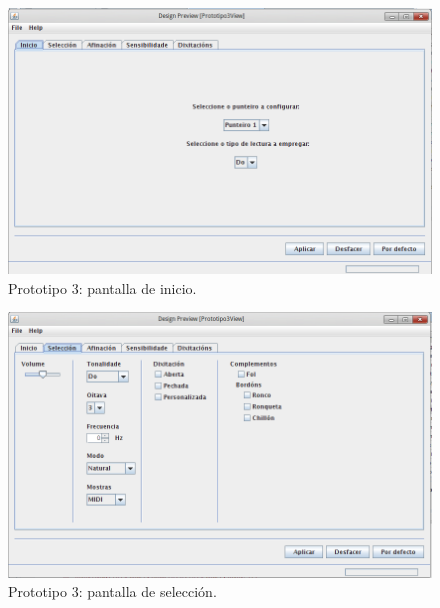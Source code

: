   \begin{figure}[htbp]
   \centering
   \includegraphics[scale=0.6,keepaspectratio=true]{./imagenes/prototipo3-1.png}
   \caption{Prototipo 3: pantalla de inicio.}
   \label{figura:Prototipo3Inicio}
  \end{figure}

  \begin{figure}[htbp]
   \centering
   \includegraphics[scale=0.6,keepaspectratio=true]{./imagenes/prototipo3-2.png}
   \caption{Prototipo 3: pantalla de selección.}
   \label{figura:Prototipo3Seleccion}
  \end{figure}

